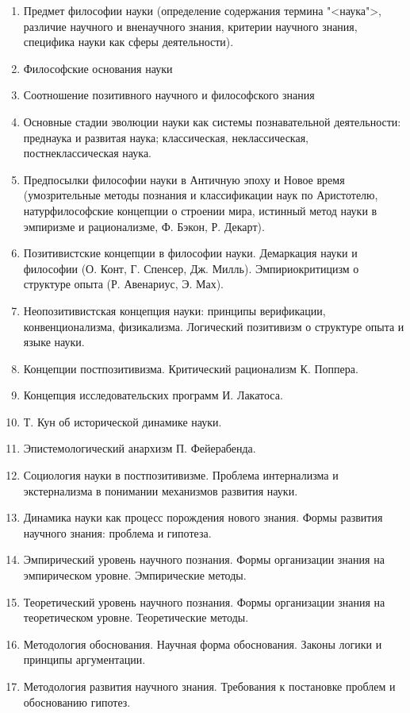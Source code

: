 \documentclass[main.tex]{subfiles}
\begin{document}

\begin{enumerate}
	\item Предмет философии науки (определение содержания термина "<наука">, различие научного и вненаучного знания, критерии научного знания, специфика науки как сферы деятельности).
	\item Философские основания науки
	\item Соотношение позитивного научного и философского знания
	\item Основные стадии эволюции науки как системы познавательной деятельности: преднаука и развитая наука; классическая, неклассическая, постнеклассическая наука.
	\item Предпосылки философии науки в Античную эпоху и Новое время (умозрительные методы познания и классификации наук по Аристотелю, натурфилософские концепции о строении мира, истинный метод науки в эмпиризме и рационализме, Ф. Бэкон, Р. Декарт).
	\item Позитивистские концепции в философии науки. Демаркация науки и философии (О. Конт, Г. Спенсер, Дж. Милль). Эмпириокритицизм о структуре опыта (Р. Авенариус, Э. Мах).
	\item Неопозитивистская концепция науки: принципы верификации, конвенционализма, физикализма. Логический позитивизм о структуре опыта и языке науки.
	\item Концепции постпозитивизма. Критический рационализм К. Поппера.
	\item Концепция исследовательских программ И. Лакатоса.
	\item Т. Кун об исторической динамике науки.
	\item Эпистемологический анархизм П. Фейерабенда.
	\item Социология науки в постпозитивизме. Проблема интернализма и экстернализма в понимании механизмов развития науки.
	\item Динамика науки как процесс порождения нового знания. Формы развития научного знания: проблема и гипотеза.
	\item Эмпирический уровень научного познания. Формы организации знания на эмпирическом уровне. Эмпирические методы.
	\item Теоретический уровень научного познания. Формы организации знания на теоретическом уровне. Теоретические методы.
	\item Методология обоснования. Научная форма обоснования. Законы логики и принципы аргументации.
	\item Методология развития научного знания. Требования к постановке проблем и обоснованию гипотез.

\end{enumerate}
\end{document}
